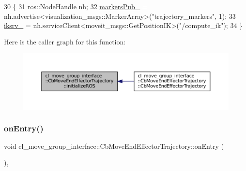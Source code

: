 \begin{DoxyCode}
30     \{
31         ros::NodeHandle nh;
32         \hyperlink{classcl__move__group__interface_1_1CbMoveEndEffectorTrajectory_aabc2216b2d8625fecd83c5ec69928e63}{markersPub\_} = nh.advertise<visualization\_msgs::MarkerArray>(\textcolor{stringliteral}{"trajectory\_markers"}, 1);
33         \hyperlink{classcl__move__group__interface_1_1CbMoveEndEffectorTrajectory_a8a2e2225a5b53325241e45e4e28fa3a7}{iksrv\_} = nh.serviceClient<moveit\_msgs::GetPositionIK>(\textcolor{stringliteral}{"/compute\_ik"});
34     \}
\end{DoxyCode}
Here is the caller graph for this function\+:
\nopagebreak
\begin{figure}[H]
\begin{center}
\leavevmode
\includegraphics[width=350pt]{classcl__move__group__interface_1_1CbMoveEndEffectorTrajectory_afcee8f3853a5cef8806137a304c8a14b_icgraph}
\end{center}
\end{figure}
\mbox{\label{classcl__move__group__interface_1_1CbMoveEndEffectorTrajectory_aaedd074fd178c6390a4a3f1ccff23ad3}} 
\subsubsection{\texorpdfstring{on\+Entry()}{onEntry()}}
{\footnotesize\ttfamily void cl\+\_\+move\+\_\+group\+\_\+interface\+::\+Cb\+Move\+End\+Effector\+Trajectory\+::on\+Entry (\begin{DoxyParamCaption}{ }\end{DoxyParamCaption})\hspace{0.3cm}{\ttfamily [override]}, {\ttfamily [virtual]}}



